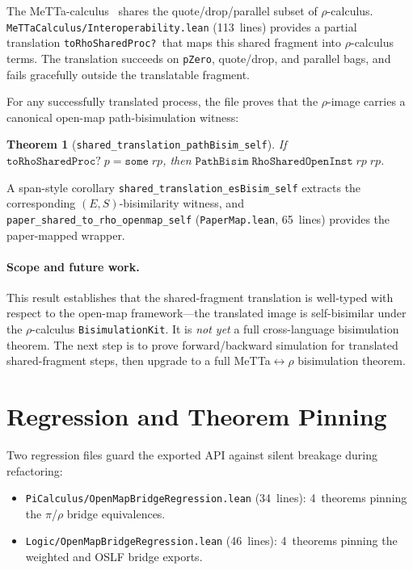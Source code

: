 \documentclass[11pt]{article}
\newtheorem{theorem}{Theorem}[section]
\begin{document}
The MeTTa-calculus~\cite{MeredithMeTTaCalculus2024} shares the
quote/drop/parallel subset of $\rho$-calculus.
\texttt{MeTTaCalculus/\allowbreak{}Interoperability.lean}
(113~lines) provides a partial translation
\texttt{toRhoSharedProc?}\ that maps this shared fragment into
$\rho$-calculus terms.  The translation succeeds on
\texttt{pZero}, quote/drop, and parallel bags, and fails
gracefully outside the translatable fragment.

For any successfully translated process, the file proves that the
$\rho$-image carries a canonical open-map path-bisimulation witness:

\begin{theorem}[\texttt{shared\_translation\_pathBisim\_self}]
If $\texttt{toRhoSharedProc?}\;p = \texttt{some}\;rp$, then
$\texttt{PathBisim}\;\texttt{RhoSharedOpenInst}\;rp\;rp$.
\end{theorem}

\noindent
A span-style corollary \texttt{shared\_translation\_esBisim\_self}
extracts the corresponding $(E,S)$-bisimilarity witness, and
\texttt{paper\_shared\_to\_rho\_openmap\_self} (\texttt{PaperMap.lean},
65~lines) provides the paper-mapped wrapper.

\paragraph{Scope and future work.}
This result establishes that the shared-fragment translation is
well-typed with respect to the open-map framework---the translated image
is self-bisimilar under the $\rho$-calculus \texttt{BisimulationKit}.
It is \emph{not yet} a full cross-language bisimulation theorem.  The
next step is to prove forward/backward simulation for translated
shared-fragment steps, then upgrade to a full
MeTTa$\leftrightarrow$$\rho$ bisimulation theorem.


\section{Regression and Theorem Pinning}\label{sec:regression}

Two regression files guard the exported API against silent breakage
during refactoring:

\begin{itemize}
\item \texttt{PiCalculus/OpenMapBridgeRegression.lean} (34~lines):
  4~theorems pinning the $\pi$/$\rho$ bridge equivalences.
\item \texttt{Logic/OpenMapBridgeRegression.lean} (46~lines):
  4~theorems pinning the weighted and OSLF bridge exports.
\end{itemize}
\end{document}
